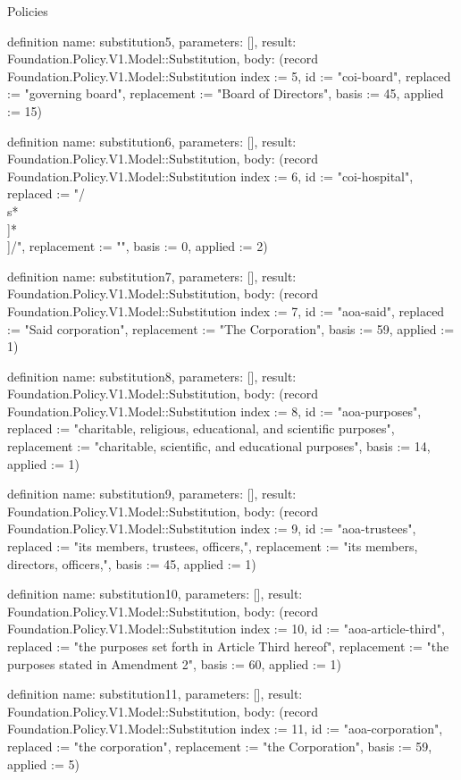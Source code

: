\begin{lexlean}{Policies}
\begin{semanticmodule}
definition{
  name: substitution5,
  parameters: [],
  result: Foundation.Policy.V1.Model::Substitution,
  body: (record Foundation.Policy.V1.Model::Substitution {index := 5, id := "coi-board", replaced := "governing board", replacement := "Board of Directors", basis := 45, applied := 15})
}

definition{
  name: substitution6,
  parameters: [],
  result: Foundation.Policy.V1.Model::Substitution,
  body: (record Foundation.Policy.V1.Model::Substitution {index := 6, id := "coi-hospital", replaced := "/\\s*\\[Hospital insert[^\\]]*\\]/", replacement := "", basis := 0, applied := 2})
}

definition{
  name: substitution7,
  parameters: [],
  result: Foundation.Policy.V1.Model::Substitution,
  body: (record Foundation.Policy.V1.Model::Substitution {index := 7, id := "aoa-said", replaced := "Said corporation", replacement := "The Corporation", basis := 59, applied := 1})
}

definition{
  name: substitution8,
  parameters: [],
  result: Foundation.Policy.V1.Model::Substitution,
  body: (record Foundation.Policy.V1.Model::Substitution {index := 8, id := "aoa-purposes", replaced := "charitable, religious, educational, and scientific purposes", replacement := "charitable, scientific, and educational purposes", basis := 14, applied := 1})
}

definition{
  name: substitution9,
  parameters: [],
  result: Foundation.Policy.V1.Model::Substitution,
  body: (record Foundation.Policy.V1.Model::Substitution {index := 9, id := "aoa-trustees", replaced := "its members, trustees, officers,", replacement := "its members, directors, officers,", basis := 45, applied := 1})
}

definition{
  name: substitution10,
  parameters: [],
  result: Foundation.Policy.V1.Model::Substitution,
  body: (record Foundation.Policy.V1.Model::Substitution {index := 10, id := "aoa-article-third", replaced := "the purposes set forth in Article Third hereof", replacement := "the purposes stated in Amendment 2", basis := 60, applied := 1})
}

definition{
  name: substitution11,
  parameters: [],
  result: Foundation.Policy.V1.Model::Substitution,
  body: (record Foundation.Policy.V1.Model::Substitution {index := 11, id := "aoa-corporation", replaced := "the corporation", replacement := "the Corporation", basis := 59, applied := 5})
}


\end{semanticmodule}
\end{lexlean}
